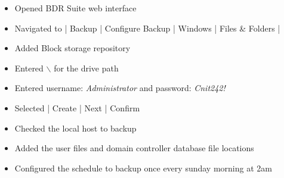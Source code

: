 \documentclass[letterpaper]{article}
\begin{document}
\begin{enumerate}
\begin{itemize}
\begin{itemize}
\item Opened BDR Suite web interface
\item Navigated to | Backup | Configure Backup | Windows | Files \& Folders |
\item Added Block storage repository
\item Entered \emph{$\backslash$\MIDDLESCHOOLPC\TheBackup} for the drive path
\item Entered username: \emph{Administrator} and password: \emph{Cnit242!}
\item Selected | Create | Next | Confirm
\item Checked the local host to backup
\item Added the user files and domain controller database file locations
\item Configured the schedule to backup once every sunday morning at 2am
\end{itemize}
\end{itemize}


\end{enumerate}
\end{document}
